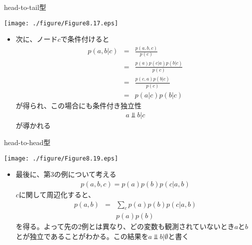 \begin{frame}{head-to-tail型}
 \begin{center}
  \texttt{[image: ./figure/Figure8.17.eps]}
 \end{center}
 \begin{itemize}
  \item 次に、ノード$c$で条件付けると
        \begin{eqnarray*}
         p(a,b|c) &=& \frac{p(a,b,c)}{p(c)}\\
         & =& \frac{p(a)p(c|a)p(b|c)}{p(c)}\\
         &= & \frac{p(c,a)p(b|c)}{p(c)}\\
         &= & p(a|c)p(b|c)
        \end{eqnarray*}
        が得られ、この場合にも条件付き独立性
        \begin{eqnarray*}
         a \Perp b | c
        \end{eqnarray*}
        が導かれる
 \end{itemize}
\end{frame}

\begin{frame}{head-to-head型}
 \begin{center}
  \texttt{[image: ./figure/Figure8.19.eps]}
 \end{center}
 \begin{itemize}
  \item 最後に、第3の例について考える
        \begin{eqnarray*}
         p(a,b,c) = p(a)p(b)p(c|a,b)
        \end{eqnarray*}
        $c$に関して周辺化すると、
        \begin{eqnarray*}
         p(a,b) &=& \sum_{c}p(a)p(b)p(c|a,b)\\
         & & p(a)p(b)
        \end{eqnarray*}
        を得る。よって先の2例とは異なり、どの変数も観測されていないとき$a$と$b$とが独立であることがわかる。この結果を$a \Perp b | \emptyset$と書く
 \end{itemize}
\end{frame}

